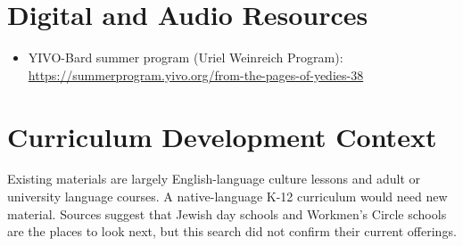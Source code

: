 \documentclass[12pt]{article}
\begin{document}
\section{Digital and Audio Resources}
\begin{itemize}
\item YIVO-Bard summer program (Uriel Weinreich Program): \url{https://summerprogram.yivo.org/from-the-pages-of-yedies-38}
\end{itemize}

\section{Curriculum Development Context}
Existing materials are largely English-language culture lessons and adult or university language courses. A native-language K-12 curriculum would need new material. Sources suggest that Jewish day schools and Workmen's Circle schools are the places to look next, but this search did not confirm their current offerings.
\end{document}
